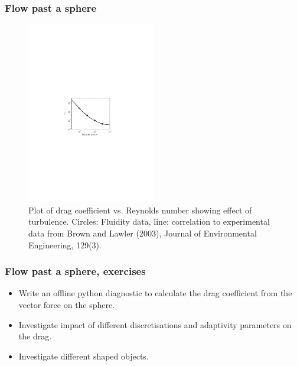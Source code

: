 \begin{frame}
    \frametitle{Flow past a sphere}
\begin{figure}
\centering
\includegraphics[width=0.5\textwidth]{./flow_past_sphere/Sphere_Drag.pdf}
\caption{Plot of drag coefficient vs. Reynolds number showing effect of turbulence. Circles: Fluidity data, line: correlation to experimental data from Brown and Lawler (2003), Journal of Environmental Engineering, 129(3).}
\end{figure}
\end{frame}

\begin{frame}
\frametitle{Flow past a sphere, exercises}
\begin{itemize}
\item Write an offline python diagnostic to calculate the drag coefficient from the vector force on the sphere.
\item Investigate impact of different discretisations and adaptivity parameters on the drag.
\item Investigate different shaped objects.
\end{itemize}
\end{frame}

